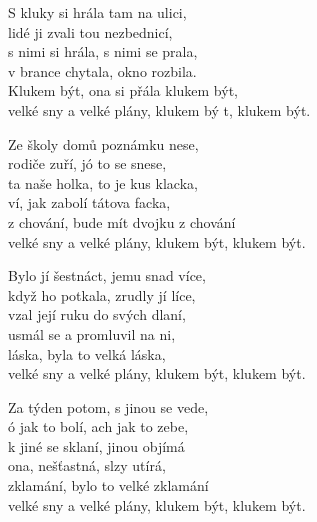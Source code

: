  \ve
{}S kluky si hrála tam na ulici, \\
lidé ji zvali tou nezbednicí, \\
s nimi si hrála, s nimi se prala,\\
v brance chytala, okno rozbila. \\
Klukem být, ona si přála klukem být, \\
velké sny a velké plány, klukem bý t, klukem být. 

 \ve
Ze školy domů poznámku nese,\\
rodiče zuří, jó to se snese, \\
ta naše holka, to je kus klacka,\\ 
ví, jak zabolí tátova facka, \\
z chování, bude mít dvojku z chování\\ 
velké sny a velké plány, klukem být, klukem být. 

   \ve 
Bylo jí šestnáct, jemu snad více, \\
když ho potkala, zrudly jí líce, \\
vzal její ruku do svých dlaní, \\
usmál se a promluvil na ni, \\
láska, byla to velká láska, \\
velké sny a velké plány, klukem být, klukem být.
 
   \ve 
Za týden potom, s jinou se vede, \\
ó jak to bolí, ach jak to zebe, \\
k jiné se sklaní, jinou objímá \\
ona, nešťastná, slzy utírá, \\
zklamání, bylo to velké zklamání \\
velké sny a velké plány, klukem být, klukem být.
\esong
